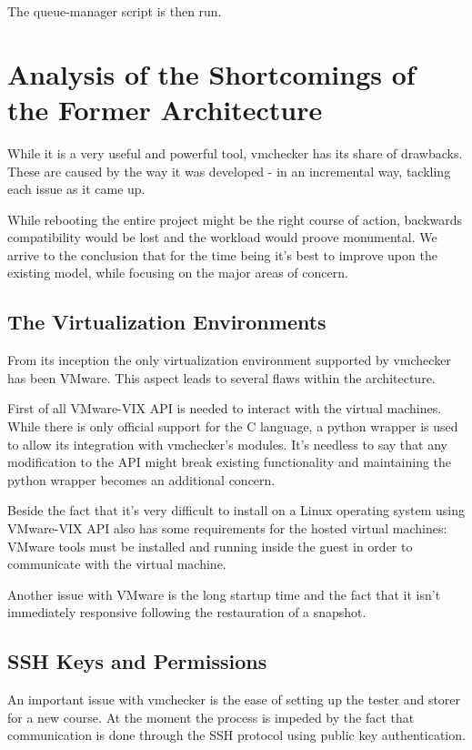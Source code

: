 The queue-manager script is then run. 


\section{Analysis of the Shortcomings of the Former Architecture}
\label{sec:vmc-analysis}

While it is a very useful and powerful tool, vmchecker has its share of drawbacks.
These are caused by the way it was developed - in an incremental way, tackling 
each issue as it came up. 

While rebooting the entire project might be the right course of action, 
backwards compatibility would be lost and the workload would 
proove monumental. We arrive to the conclusion that for the time being it's best
to improve upon the existing model, while focusing on the major areas of concern.

\subsection{The Virtualization Environments}
\label{sub-sec:vmc-analysis-env}

From its inception the only virtualization environment supported by vmchecker 
has been VMware. This aspect leads to several flaws within the architecture.

First of all VMware-VIX API is needed to interact with the virtual machines. 
While there is only official support for the C language, a python wrapper is
used to allow its integration with vmchecker's modules. It's needless to say
that any modification to the API might break existing functionality and 
maintaining the python wrapper becomes an additional concern.

Beside the fact that it's very difficult to install on a Linux operating system
using VMware-VIX API also has some requirements for the hosted virtual machines:
VMware tools must be installed and running inside the guest in order to communicate
with the virtual machine.

Another issue with VMware is the long startup time and the fact that it isn't 
immediately responsive following the restauration of a snapshot.

\subsection{SSH Keys and Permissions}
\label{sub-sec:vmc-analysis-ssh}

An important issue with vmchecker is the ease of setting up the tester and storer
for a new course. At the moment the process is impeded by the fact that communication
is done through the SSH protocol using public key authentication. 

